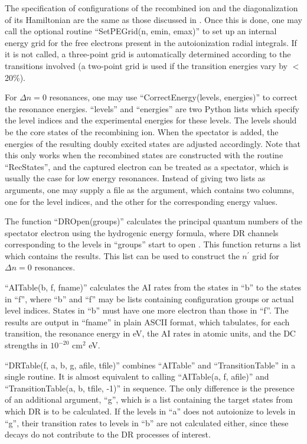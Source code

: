 \documentclass{elsart}
\begin{document}
The specification of configurations of the recombined ion and the
diagonalization 
of its Hamiltonian are the same as those discussed in . Once
this is done, one may call the optional routine ``SetPEGrid(n, emin, emax)'' to
set up an internal energy grid for the free electrons present in the 
autoionization radial integrals. If it is not called, a three-point grid 
is automatically determined according to the transitions involved (a
two-point grid is used if the transition energies vary by $<$ 20\%).

For $\Delta n = 0$ resonances, one may use ``CorrectEnergy(levels, energies)''
to correct the resonance energies. ``levels'' and ``energies'' are two Python
lists which specify the level indices and the experimental energies for these
levels. The levels should be the core states of the recombining ion. When the
spectator is added, the energies of the resulting doubly excited states are
adjusted accordingly. Note that this only works when the recombined states are 
constructed with the routine ``RecStates'', and the captured electron can be
treated as a spectator, which is usually the case for low energy
resonances. Instead of giving two lists as arguments, one may supply
a file as the argument, which contains 
two columns, one for the level indices, and the other for the corresponding
energy values.

The function ``DROpen(groups)'' calculates the principal quantum numbers of
the spectator electron using the hydrogenic energy formula, where DR channels
corresponding to the levels in ``groups'' start to open . This function
returns a list which contains the results. This list can be used to construct
the $n^\prime$ grid for $\Delta n = 0$ resonances.

``AITable(b, f, fname)'' calculates the AI rates from the states in ``b'' to
the states in ``f'', where ``b'' and ``f'' may be lists containing
configuration groups or actual level indices. States in ``b'' must have one
more electron than those 
in ``f''. The results are output in ``fname'' in plain ASCII format, which
tabulates, for each transition, the resonance energy in eV, the AI rates in
atomic units, and the DC strengths in $10^{-20}$ cm$^2$ eV. 

``DRTable(f, a, b, g, afile, tfile)'' combines ``AITable'' and
``TransitionTable'' in a single routine. It is almost equivalent to calling 
``AITable(a, f, afile)'' and ``TransitionTable(a, b, tfile, -1)'' in
sequence. The only difference is the presence of an additional argument,
``g'', which is a list containing the target states from which DR is
to be calculated. If the levels in ``a'' does not autoionize to levels in
``g'', their transition rates to levels in ``b'' are not calculated either,
since these decays do not contribute to the DR processes of interest.
\end{document}
